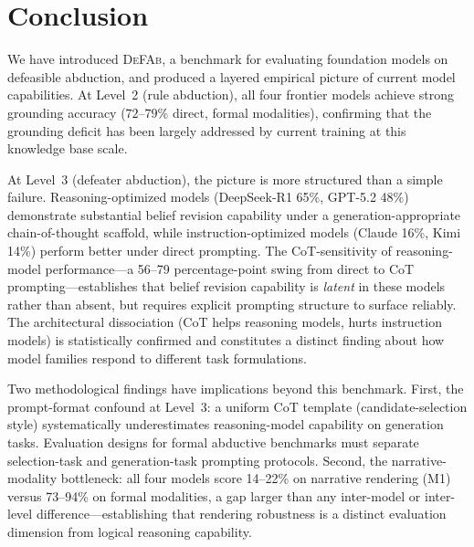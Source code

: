 \documentclass{article}
\theoremstyle{definition}
\begin{document}
\section{Conclusion}\label{sec:conclusion}

We have introduced \textsc{DeFAb}, a benchmark for evaluating foundation models on defeasible abduction, and produced a layered empirical picture of current model capabilities. At Level~2 (rule abduction), all four frontier models achieve strong grounding accuracy ($72$--$79\%$ direct, formal modalities), confirming that the grounding deficit has been largely addressed by current training at this knowledge base scale.

At Level~3 (defeater abduction), the picture is more structured than a simple failure. Reasoning-optimized models (DeepSeek-R1 65\%, GPT-5.2 48\%) demonstrate substantial belief revision capability under a generation-appropriate chain-of-thought scaffold, while instruction-optimized models (Claude 16\%, Kimi 14\%) perform better under direct prompting. The CoT-sensitivity of reasoning-model performance---a 56--79 percentage-point swing from direct to CoT prompting---establishes that belief revision capability is \emph{latent} in these models rather than absent, but requires explicit prompting structure to surface reliably. The architectural dissociation (CoT helps reasoning models, hurts instruction models) is statistically confirmed and constitutes a distinct finding about how model families respond to different task formulations.

Two methodological findings have implications beyond this benchmark. First, the prompt-format confound at Level~3: a uniform CoT template (candidate-selection style) systematically underestimates reasoning-model capability on generation tasks. Evaluation designs for formal abductive benchmarks must separate selection-task and generation-task prompting protocols. Second, the narrative-modality bottleneck: all four models score 14--22\% on narrative rendering (M1) versus 73--94\% on formal modalities, a gap larger than any inter-model or inter-level difference---establishing that rendering robustness is a distinct evaluation dimension from logical reasoning capability.
\end{document}

